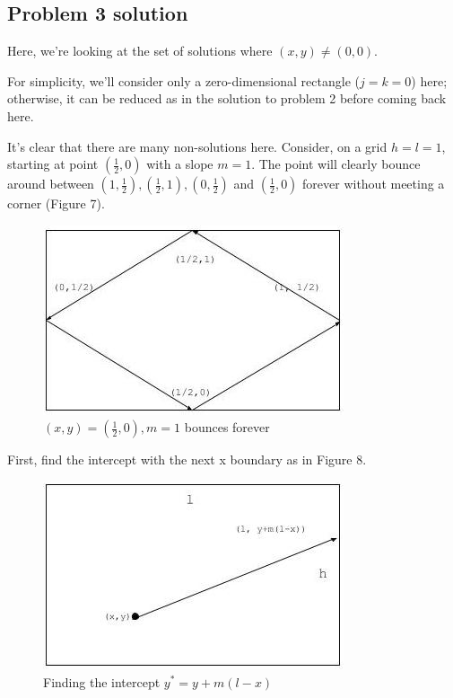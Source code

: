 \documentclass[11pt, oneside]{article} 	%
\begin{document}
\subsection{Problem 3 solution}

Here, we're looking at the set of solutions where $(x, y) \neq (0, 0)$.

For simplicity, we'll consider only a zero-dimensional rectangle ($j = k = 0$) here; otherwise, it can be reduced as in the solution to problem 2 before coming back here.

It's clear that there are many non-solutions here. Consider, on a grid $h = l = 1$, starting at point $(\frac{1}{2}, 0)$ with a slope $m = 1$. The point will clearly bounce around between $(1, \frac{1}{2}), (\frac{1}{2}, 1), (0, \frac{1}{2})$ and $ (\frac{1}{2}, 0)$ forever without meeting a corner (Figure 7).

\begin{figure}[!htb]
\centering
\includegraphics[scale=.4]{bounceforever}
\caption{$(x, y) = (\frac{1}{2}, 0), m = 1$ bounces forever}
\end{figure}

First, find the intercept with the next x boundary as in Figure 8.

\begin{figure}[!htb]
\centering
\includegraphics[scale=.4]{intercept}
\caption{Finding the intercept $y^* = y + m(l-x)$}
\end{figure}
\end{document}
